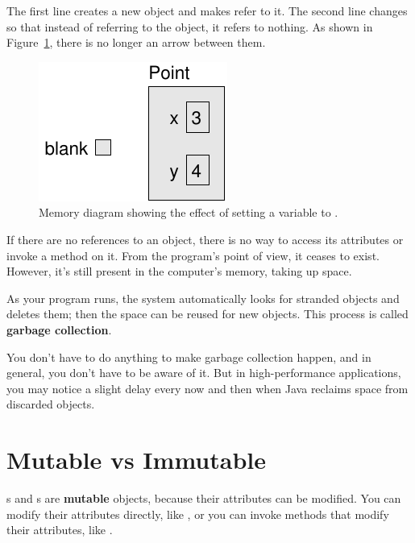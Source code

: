 The first line creates a new  object and makes  refer to it.
The second line changes  so that instead of referring to the object, it refers to nothing.
As shown in Figure~\ref{fig.reference3}, there is no longer an arrow between them.


\begin{figure}[!ht]
\begin{center}
\includegraphics{figs/reference3.pdf}
\caption{Memory diagram showing the effect of setting a variable to .}
\label{fig.reference3}
\end{center}
\end{figure}

If there are no references to an object, there is no way to access its attributes or invoke a method on it.
From the program's point of view, it ceases to exist.
However, it's still present in the computer's memory, taking up space.


As your program runs, the system automatically looks for stranded objects and deletes them; then the space can be reused for new objects.
This process is called {\bf garbage collection}.

You don't have to do anything to make garbage collection happen, and in general, you don't have to be aware of it.
But in high-performance applications, you may notice a slight delay every now and then when Java reclaims space from discarded objects.


\section{Mutable vs Immutable}


s and s are {\bf mutable} objects, because their attributes can be modified.
You can modify their attributes directly, like , or you can invoke methods that modify their attributes, like .

